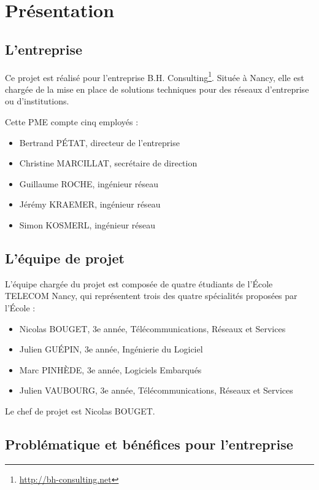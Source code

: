 \newcommand{\titreA}{Authentifications Radius}
\newcommand{\titreB}{Note de cadrage}


\section{Présentation}
\subsection{L'entreprise}

Ce projet est réalisé pour l'entreprise B.H. Consulting\footnote{\url{http://bh-consulting.net}}. Située à Nancy, elle est chargée de la mise en place de solutions techniques pour des réseaux d'entreprise ou d'institutions.

Cette PME compte cinq employés :

\begin{itemize}
\item Bertrand PÉTAT, directeur de l'entreprise
\item Christine MARCILLAT, secrétaire de direction
\item Guillaume ROCHE, ingénieur réseau
\item Jérémy KRAEMER, ingénieur réseau
\item Simon KOSMERL, ingénieur réseau
\end{itemize}

\subsection{L'équipe de projet}

L'équipe chargée du projet est composée de quatre étudiants de l'École TELECOM Nancy, qui représentent trois des quatre spécialités proposées par l'École :

\begin{itemize}
\item Nicolas BOUGET, 3e année, Télécommunications, Réseaux et Services
\item Julien GUÉPIN, 3e année, Ingénierie du Logiciel
\item Marc PINHÈDE, 3e année, Logiciels Embarqués
\item Julien VAUBOURG, 3e année, Télécommunications, Réseaux et Services
\end{itemize}

Le chef de projet est Nicolas BOUGET.

\subsection{Problématique et bénéfices pour l'entreprise}

